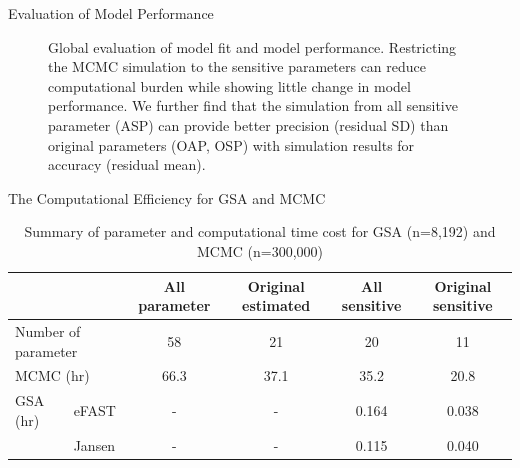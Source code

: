 \documentclass[xcolor=table]{beamer}
\begin{document}
\begin{frame}[t]
\begin{columns}[t]
\begin{column}{0.22\paperwidth}
\begin{block}{Evaluation of Model Performance}
\begin{figure}
\begin{columns}
\caption{Global evaluation of model fit and model performance. Restricting the MCMC simulation to the sensitive parameters can reduce computational burden while showing little change in model performance.
We further find that the simulation from all sensitive parameter (ASP) can provide better precision (residual SD) than original parameters (OAP, OSP) with simulation results for accuracy (residual mean).}
\label{fig:example right}
\end{columns}
\end{figure}
\end{block}
%
\begin{block}{The Computational Efficiency for GSA and MCMC}
\begin{table}
\begin{adjustbox}{max width=\textwidth}
\begin{threeparttable}
  \centering
  \caption{Summary of parameter and computational time cost for GSA (n=8,192) and MCMC (n=300,000)}
  \label{tab:table1}
  \begin{tabular}{llcccc}
  \rowcolor{Maroon!30}   
    \toprule
    &  & All parameter & Original estimated & All sensitive & Original sensitive \\
    \midrule
    \multicolumn{2}{l}{Number of parameter} & 58 & 21 & 20 & 11 \\
    \multicolumn{2}{l}{MCMC (hr)} & 66.3 & 37.1 & 35.2 & 20.8 \\
	    GSA (hr) & eFAST & - & - & 0.164 & 0.038 \\
	   \multirow{2}{*}{} & Jansen & - & - & 0.115 & 0.040 \\

\end{tabular}
\end{threeparttable}
\end{adjustbox}
\end{table}
\end{block}
\end{column}
\end{columns}
\end{frame}
\end{document}

